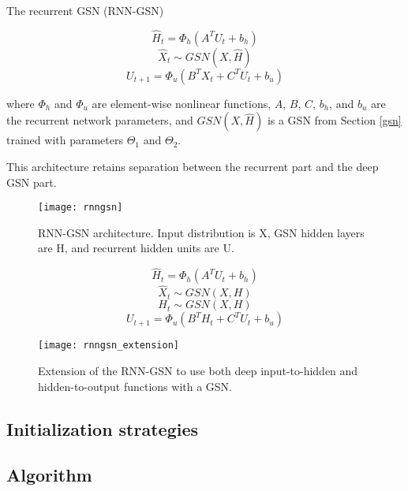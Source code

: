 The recurrent GSN (RNN-GSN) 

\begin{equation}
	\hat{H}_t = \Phi_{h}(A^TU_{t} + b_h)
\end{equation}
\begin{equation}
	\hat{X}_t \sim GSN(X,\hat{H})
\end{equation}
\begin{equation}
	U_{t+1} = \Phi_{u}(B^TX_t + C^TU_t + b_u)
\end{equation}

where \(\Phi_h\) and \(\Phi_u\) are element-wise nonlinear functions,  $A$, $B$, $C$, $b_h$, and $b_u$ are the recurrent network parameters, and $GSN(X,\hat{H})$ is a GSN from Section \ref{gsn} trained with parameters $\Theta_1$ and $\Theta_2$.

This architecture retains separation between the recurrent part and the deep GSN part.

\begin{figure}[h!]
  \centering
    \texttt{[image: rnngsn]}
\caption{RNN-GSN architecture. Input distribution is X, GSN hidden layers are H, and recurrent hidden units are U.}
\end{figure}

\begin{equation}
	\hat{H}_t = \Phi_{h}(A^TU_{t} + b_h)
\end{equation}
\begin{equation}
	\hat{X}_t \sim GSN(X,H)
\end{equation}
\begin{equation}
	H_t \sim GSN(X,H)
\end{equation}
\begin{equation}
	U_{t+1} = \Phi_{u}(B^TH_t + C^TU_t + b_u)
\end{equation}

\begin{figure}[h!]
  \centering
    \texttt{[image: rnngsn\_extension]}
\caption{Extension of the RNN-GSN to use both deep input-to-hidden and hidden-to-output functions with a GSN.}
\end{figure}

\subsection{Initialization strategies}
\cite{initialization}

\subsection{Algorithm}